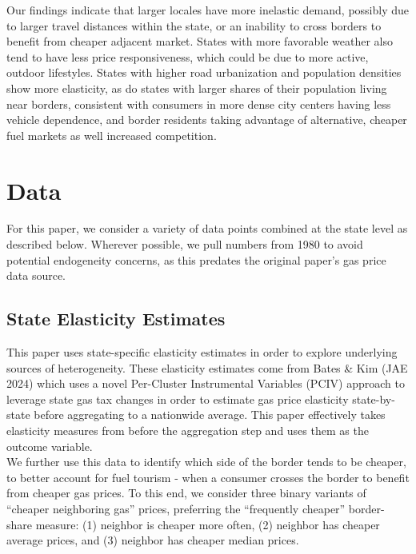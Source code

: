 Our findings indicate that larger locales have more inelastic demand, possibly due to larger travel distances within the state, or an inability to cross borders to benefit from cheaper adjacent market. States with more favorable weather also tend to have less price responsiveness, which could be due to more active, outdoor lifestyles. States with higher road urbanization and population densities show more elasticity, as do states with larger shares of their population living near borders, consistent with consumers in more dense city centers having less vehicle dependence, and border residents taking advantage of alternative, cheaper fuel markets as well increased competition. \\

\section{Data}
For this paper, we consider a variety of data points combined at the state level as described below. Wherever possible, we pull numbers from 1980 to avoid potential endogeneity concerns, as this predates the original paper's gas price data source. 

\subsection{State Elasticity Estimates}
This paper uses state-specific elasticity estimates in order to explore underlying sources of heterogeneity. These elasticity estimates come from Bates \& Kim (JAE 2024) which uses a novel Per-Cluster Instrumental Variables (PCIV) approach to leverage state gas tax changes in order to estimate gas price elasticity state-by-state before aggregating to a nationwide average. This paper effectively takes elasticity measures from before the aggregation step and uses them as the outcome variable. \\

We further use this data to identify which side of the border tends to be cheaper, to better account for fuel tourism - when a consumer crosses the border to benefit from cheaper gas prices. To this end, we consider three binary variants of ``cheaper neighboring gas'' prices, preferring the ``frequently cheaper'' border-share measure: (1) neighbor is cheaper more often, (2) neighbor has cheaper average prices, and (3) neighbor has cheaper median prices. \\

